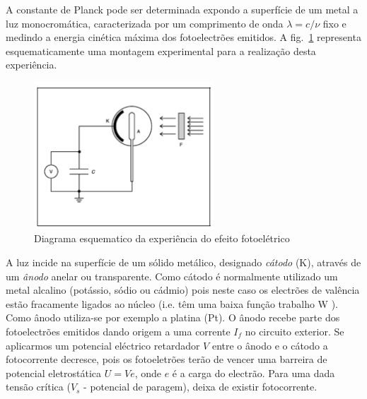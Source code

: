 \documentclass[a4paper,12pt]{article}  %
\begin{document}

A constante de Planck pode ser determinada expondo a superfície de um metal a luz monocromática, caracterizada por um comprimento de onda $\lambda=c /\nu$ fixo e medindo a energia cinética máxima dos fotoelectrões emitidos. A fig.~\ref{fig:plack_exp} representa esquematicamente uma montagem experimental para a realização desta experiência.

\begin{figure}[htb] 
	\centering 
	\includegraphics[width=0.6\textwidth]{planck_exp} 
	\caption{Diagrama esquematico da experiência do efeito fotoelétrico} \label{fig:plack_exp}
\end{figure}


A luz incide na superfície de um sólido metálico, designado \emph{cátodo} (K), através de um \emph{ânodo} anelar ou transparente. 
Como cátodo é normalmente utilizado um metal alcalino (potássio, sódio ou cádmio)  pois neste caso os electrões de valência estão fracamente 
ligados ao núcleo (i.e. têm uma baixa função trabalho W ). Como ânodo utiliza-se por exemplo a platina (Pt). 
O ânodo recebe parte dos fotoelectrões emitidos dando origem a uma corrente $I_f$ no circuito exterior. 
Se aplicarmos um potencial eléctrico retardador $V$ entre o ânodo e o cátodo a fotocorrente decresce, pois os fotoeletrões terão de vencer uma barreira de potencial eletrostática $U=V e$, onde $e$ é a carga do electrão. 
Para uma dada tensão crítica ($V_s$ - potencial de paragem), deixa de existir fotocorrente. 
\end{document}
